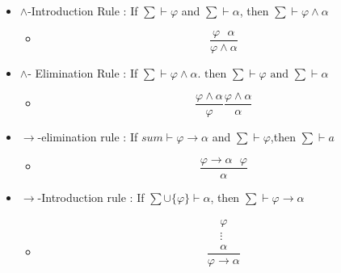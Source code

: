 \documentclass{article}
\begin{document}
\begin{itemize}
\item \(\wedge\)-Introduction Rule : If \(\sum \vdash \varphi\) and \(\sum \vdash \alpha\), then \(\sum \vdash \varphi \wedge \alpha\)
\begin{itemize}
\item $$ \frac{\varphi \text{    } \alpha }{\varphi \wedge 
\alpha}$$
\end{itemize}

\item \(\wedge\)- Elimination Rule : If \(\sum \vdash \varphi \wedge \alpha. \text{ then } \sum \vdash \varphi \text{ and } \sum \vdash \alpha \)
\begin{itemize}
\item $$\frac{\varphi \wedge \alpha}{\varphi}  \frac{\varphi \wedge \alpha}{\alpha}$$
\end{itemize}

\item \(\rightarrow\)-elimination rule : If \(sum \vdash \varphi \rightarrow \alpha \) and \( \sum \vdash \varphi\),then \(\sum \vdash a\)
\begin{itemize}
\item $$\frac{\varphi \rightarrow \alpha \text{    } \varphi}{\alpha}$$
\end{itemize}

\item \(\rightarrow\)-Introduction rule : If \(\sum \cup \{ \varphi \} \vdash \alpha\), then \(\sum \vdash \varphi \rightarrow \alpha\)
\begin{itemize}
\item $$ \frac{\begin{matrix} \varphi \\ \vdots \\ \alpha \end{matrix}}{\varphi \rightarrow \alpha}$$
\end{itemize}
\end{itemize}
\end{document}
